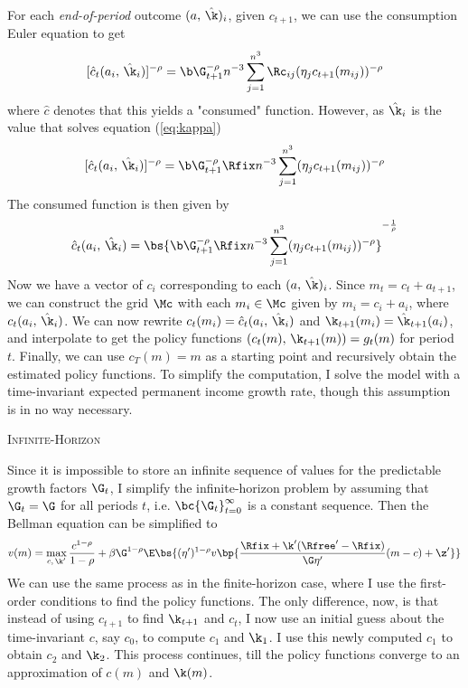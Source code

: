 For each \textit{end-of-period} outcome $(a,\,\hat{\k})_i$, given $c_{t+1}$, we can use the consumption Euler equation to get
\[
[\hat{c}_t(a_i,\,\hat{\k}_i)]^{-\rho} = \b\G_{t+1}^{-\rho} n^{-3}\sum_{j=1}^{n^3}\Rc_{ij}(\eta_{j}c_{t+1}(m_{ij}))^{-\rho}
\]
where $\hat{c}$ denotes that this yields a "consumed" function. However, as $\hat{\k}_{i}$ is the value that solves equation (\ref{eq:kappa})
\[
[\hat{c}_{t}(a_i,\,\hat{\k}_i)]^{-\rho} = \b\G_{t+1}^{-\rho}\Rfix n^{-3}\sum_{j=1}^{n^3}(\eta_{j}c_{t+1}(m_{ij}))^{-\rho}
\]
The consumed function is then given by
\[
\hat{c}_{t}(a_i,\,\hat{\k}_i) = \bs{\b\G_{t+1}^{-\rho}\Rfix n^{-3}\sum_{j=1}^{n^3}(\eta_{j}c_{t+1}(m_{ij}))^{-\rho}}^{-\frac{1}{\rho}}
\]
Now we have a vector of $c_i$ corresponding to each $(a,\,\hat{\k})_i$. Since $m_{t} = c_{t} + a_{t+1}$, we can construct the grid $\Mc$ with each $m_i \in \Mc$ given by $m_i = c_i + a_i$, where $c_{t}(a_i,\,\hat{\k}_i)$. We can now rewrite $c_t(m_i) = \hat{c}_t(a_i,\,\hat{\k}_i)$ and $\k_{t+1}(m_i) = \hat{\k}_{t+1}(a_i)$, and interpolate to get the policy functions $(c_{t}(m),\,\k_{t+1}(m)) = g_{t}(m)$ for period $t$. Finally, we can use $c_{T}(m) = m$ as a starting point and recursively obtain the estimated policy functions. To simplify the computation, I solve the model with a time-invariant expected permanent income growth rate, though this assumption is in no way necessary.

\textsc{Infinite-Horizon}

Since it is impossible to store an infinite sequence of values for the predictable growth factors $\G_{t}$, I simplify the infinite-horizon problem by assuming that $\G_{t} = \G$ for all periods $t$, i.e. $\bc{\G_{t}}_{t=0}^{\infty}$ is a constant sequence. Then the Bellman equation can be simplified to
\[
v(m) = \max_{c,\,\k'}\frac{c^{1-\rho}}{1-\rho} + \beta\G^{1-\rho} \E\bs{(\eta')^{1-\rho}v\bp{\frac{\Rfix + \k'(\Rfree' - \Rfix)}{\G\eta'}(m - c) + \z'}}
\]
We can use the same process as in the finite-horizon case, where I use the first-order conditions to find the policy functions. The only difference, now, is that instead of using $c_{t+1}$ to find $\k_{t+1}$ and $c_{t}$, I now use an initial guess about the time-invariant $c$, say $c_{0}$, to compute $c_{1}$ and $\k_1$. I use this newly computed $c_1$ to obtain $c_2$ and $\k_2$. This process continues, till the policy functions converge to an approximation of $c(m)$ and $\k(m)$.

